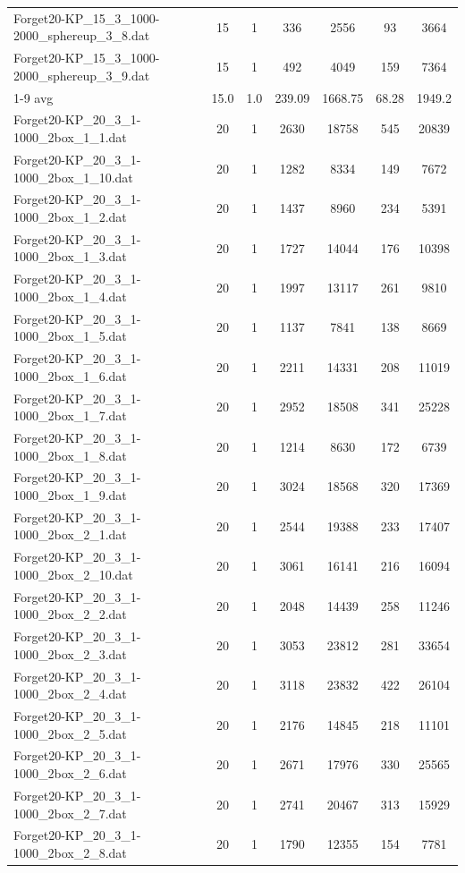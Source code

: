 \begin{table}[!ht]
\begin{tabular}{lcccccc}
Forget20-KP\_15\_3\_1000-2000\_sphereup\_3\_8.dat & 15 & 1 & 336 & 2556 & 93 & 3664 \\
Forget20-KP\_15\_3\_1000-2000\_sphereup\_3\_9.dat & 15 & 1 & 492 & 4049 & 159 & 7364 \\
\cline{1-9} avg & 15.0 & 1.0 & 239.09& 1668.75 & 68.28& 1949.2\\ \hline
Forget20-KP\_20\_3\_1-1000\_2box\_1\_1.dat & 20 & 1 & 2630 & 18758 & 545 & 20839 \\
Forget20-KP\_20\_3\_1-1000\_2box\_1\_10.dat & 20 & 1 & 1282 & 8334 & 149 & 7672 \\
Forget20-KP\_20\_3\_1-1000\_2box\_1\_2.dat & 20 & 1 & 1437 & 8960 & 234 & 5391 \\
Forget20-KP\_20\_3\_1-1000\_2box\_1\_3.dat & 20 & 1 & 1727 & 14044 & 176 & 10398 \\
Forget20-KP\_20\_3\_1-1000\_2box\_1\_4.dat & 20 & 1 & 1997 & 13117 & 261 & 9810 \\
Forget20-KP\_20\_3\_1-1000\_2box\_1\_5.dat & 20 & 1 & 1137 & 7841 & 138 & 8669 \\
Forget20-KP\_20\_3\_1-1000\_2box\_1\_6.dat & 20 & 1 & 2211 & 14331 & 208 & 11019 \\
Forget20-KP\_20\_3\_1-1000\_2box\_1\_7.dat & 20 & 1 & 2952 & 18508 & 341 & 25228 \\
Forget20-KP\_20\_3\_1-1000\_2box\_1\_8.dat & 20 & 1 & 1214 & 8630 & 172 & 6739 \\
Forget20-KP\_20\_3\_1-1000\_2box\_1\_9.dat & 20 & 1 & 3024 & 18568 & 320 & 17369 \\
Forget20-KP\_20\_3\_1-1000\_2box\_2\_1.dat & 20 & 1 & 2544 & 19388 & 233 & 17407 \\
Forget20-KP\_20\_3\_1-1000\_2box\_2\_10.dat & 20 & 1 & 3061 & 16141 & 216 & 16094 \\
Forget20-KP\_20\_3\_1-1000\_2box\_2\_2.dat & 20 & 1 & 2048 & 14439 & 258 & 11246 \\
Forget20-KP\_20\_3\_1-1000\_2box\_2\_3.dat & 20 & 1 & 3053 & 23812 & 281 & 33654 \\
Forget20-KP\_20\_3\_1-1000\_2box\_2\_4.dat & 20 & 1 & 3118 & 23832 & 422 & 26104 \\
Forget20-KP\_20\_3\_1-1000\_2box\_2\_5.dat & 20 & 1 & 2176 & 14845 & 218 & 11101 \\
Forget20-KP\_20\_3\_1-1000\_2box\_2\_6.dat & 20 & 1 & 2671 & 17976 & 330 & 25565 \\
Forget20-KP\_20\_3\_1-1000\_2box\_2\_7.dat & 20 & 1 & 2741 & 20467 & 313 & 15929 \\
Forget20-KP\_20\_3\_1-1000\_2box\_2\_8.dat & 20 & 1 & 1790 & 12355 & 154 & 7781 \\

\end{tabular}
\end{table}
